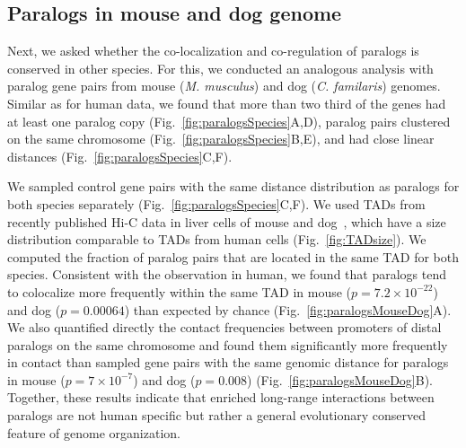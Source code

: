 \documentclass[a4paper,twoside=true,openright,parskip=full,chapterprefix=true,11pt,headings=normal,bibliography=totoc,listof=totoc,titlepage=on,captions=tableabove,draft=false]{scrreprt}
\theoremstyle{definition}
\theoremstyle{definition}
\theoremstyle{definition}
\theoremstyle{remark}
\begin{document}
\subsection{Paralogs in mouse and dog
genome}\label{paralogs-in-mouse-and-dog-genome}

Next, we asked whether the co-localization and co-regulation of paralogs
is conserved in other species. For this, we conducted an analogous
analysis with paralog gene pairs from mouse (\emph{M. musculus}) and dog
(\emph{C. familaris}) genomes. Similar as for human data, we found that
more than two third of the genes had at least one paralog copy
(Fig.~\ref{fig:paralogsSpecies}A,D), paralog pairs clustered on the same
chromosome (Fig.~\ref{fig:paralogsSpecies}B,E), and had close linear
distances (Fig.~\ref{fig:paralogsSpecies}C,F).

We sampled control gene pairs with the same distance distribution as
paralogs for both species separately
(Fig.~\ref{fig:paralogsSpecies}C,F). We used TADs from recently
published Hi-C data in liver cells of mouse and
dog~\citep{VietriRudan2015}, which have a size distribution comparable
to TADs from human cells (Fig.~\ref{fig:TADsize}). We computed the
fraction of paralog pairs that are located in the same TAD for both
species. Consistent with the observation in human, we found that
paralogs tend to colocalize more frequently within the same TAD in mouse
(\(p=7.2 \times 10^{-22}\)) and dog (\(p=0.00064\)) than expected by
chance (Fig.~\ref{fig:paralogsMouseDog}A). We also quantified directly
the contact frequencies between promoters of distal paralogs on the same
chromosome and found them significantly more frequently in contact than
sampled gene pairs with the same genomic distance for paralogs in mouse
(\(p=7\times 10^{-7}\)) and dog (\(p=0.008\))
(Fig.~\ref{fig:paralogsMouseDog}B). Together, these results indicate
that enriched long-range interactions between paralogs are not human
specific but rather a general evolutionary conserved feature of genome
organization.
\end{document}
